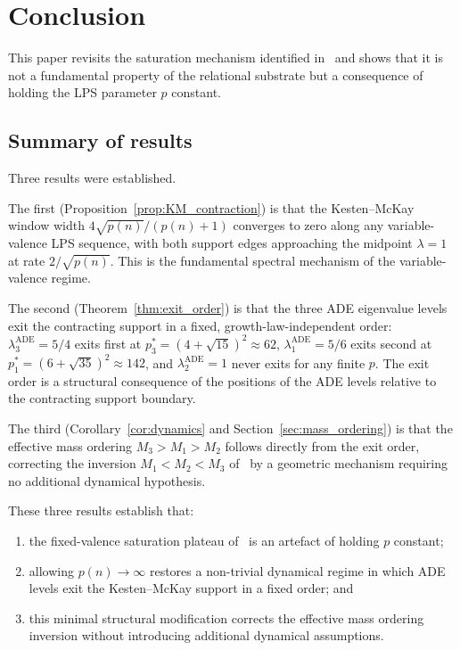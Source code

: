 \documentclass[11pt]{article}
\newcommand{\lADE}[1]{\lambda_{#1}^{\mathrm{ADE}}}
\begin{document}
  \section{Conclusion}
  \label{sec:conclusion}


  This paper revisits the saturation mechanism identified in~\cite{Beau2026a5}
  and shows that it is not a fundamental property of the relational substrate
  but a consequence of holding the LPS parameter $p$ constant.

  \subsection{Summary of results}
    \label{subsec:summary}

    Three results were established.

    The first (Proposition~\ref{prop:KM_contraction}) is that the Kesten--McKay
    window width $4\sqrt{p(n)}/(p(n)+1)$ converges to zero along any
    variable-valence LPS sequence, with both support edges approaching the midpoint
    $\lambda = 1$ at rate $2/\sqrt{p(n)}$.
    This is the fundamental spectral mechanism of the variable-valence regime.

    The second (Theorem~\ref{thm:exit_order}) is that the three ADE eigenvalue
    levels exit the contracting support in a fixed, growth-law-independent order:
    $\lADE{3} = 5/4$ exits first at $p_3^* = (4+\sqrt{15})^2 \approx 62$,
    $\lADE{1} = 5/6$ exits second at $p_1^* = (6+\sqrt{35})^2 \approx 142$, and
    $\lADE{2} = 1$ never exits for any finite $p$.
    The exit order is a structural consequence of the positions of the ADE levels
    relative to the contracting support boundary.

    The third (Corollary~\ref{cor:dynamics} and Section~\ref{sec:mass_ordering})
    is that the effective mass ordering $M_3 > M_1 > M_2$ follows directly from
    the exit order, correcting the inversion $M_1 < M_2 < M_3$ of~\cite{Beau2026a5}
    by a geometric mechanism requiring no additional dynamical hypothesis.

    These three results establish that:
    \begin{enumerate}
      \item[(i)] the fixed-valence saturation plateau of~\cite{Beau2026a5} is an
      artefact of holding $p$ constant;
      \item[(ii)] allowing $p(n) \to \infty$ restores a non-trivial dynamical
      regime in which ADE levels exit the Kesten--McKay support in a
      fixed order; and
      \item[(iii)] this minimal structural modification corrects the effective mass
      ordering inversion without introducing additional dynamical
      assumptions.
    \end{enumerate}
\end{document}
